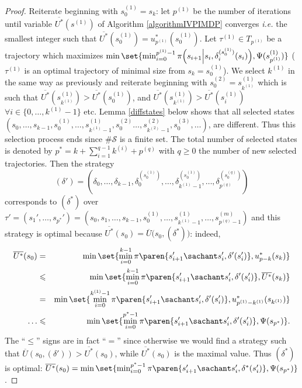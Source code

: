 \begin{proof}
Reiterate beginning with $s^{(1)}_0 = s_k$: 
let $p^{(1)}$ be the number of iterations 
until variable $\overline{U^*}(s^{(1)})$ of Algorithm \ref{algorithmIVPIMDP} converges 
\textit{i.e.} the smallest integer such that 
$\overline{U^*}(s^{(1)}_0) = u^*_{p^{(1)}}(s^{(1)}_0)$. 
Let $\tau^{(1)} \in T_{p^{(1)}}$
be a trajectory 
which maximizes 
$\min \set{ \min_{i=0}^{p^{(1)}-1} \pi \Big(s_{i+1} \Big\vert s_i, 
\delta^{(s_0^{(1)})}_i(s_i) \Big), \Psi(s_{p^{(1)}}^{(1)}) } $ 
($\tau^{(1)}$ is an optimal trajectory of minimal size from $s_k=s_0^{(1)}$). 
We select $k^{(1)}$ in the same way as previously 
and reiterate beginning with $s^{(2)}_0=s^{(1)}_{k^{(1)}}$
 which is such that $\overline{U^*}(s^{(1)}_{k^{(1)}})>\overline{U^*}(s^{(1)}_0)$, 
and $\overline{U^*}(s^{(1)}_{k^{(1)}})>\overline{U^*}(s^{(1)}_i)$ 
$\forall i \in \{0,\ldots, k^{(1)} -1 \} $ etc. 
Lemma \ref{diffstates} below shows that all selected states 
$(s_0,\ldots,s_{k-1},s_0^{(1)},\ldots,s^{(1)}_{k^{(1)}-1},s^{(2)}_0\ldots,s^{(2)}_{k^{(2)}-1},s^{(3)}_0, \ldots )$, 
are different. 
Thus this selection process ends since 
$\# \mathcal{S}$ is a finite set. 
The total number of selected states 
is denoted by $p^*=k + \sum_{i=1}^{q-1} k^{(i)} + p^{(q)}$ 
with $q \geqslant 0$ the number of new selected trajectories. 
Then the strategy 
\[ (\delta')=(\delta_0,\ldots,\delta_{k-1},\delta^{(s_0^{(1)})}_0,\ldots,\delta^{ (s_0^{(1)})}_{k^{(1)}-1},\ldots,\delta^{(s_0^{(q)})}_{p^{(q)}})\] 
corresponds to $(\delta^*)$ over $\tau'=(s_1',\ldots,s_{p^*}') 
= (s_0,s_1,\ldots,s_{k-1},s^{(1)}_{0},\ldots,s^{(1)}_{k^{(1)}-1},\ldots,s^{(m)}_{p^{(q)}-1} )$
and this strategy is optimal because 
$\overline{U^*}(s_0) = \overline{U}\Big(s_0,(\delta^*)\Big)$: indeed,
\begin{eqnarray*}
\overline{U^*}(s_0) &=& \min \set{ \min_{i=0}^{k-1} \pi \paren{s_{i+1}' \sachant s_i',\delta'(s_i') }, u^*_{p-k}(s_k) } \\
&\leqslant& \min \set{ \min_{i=0}^{k-1} \pi \paren{s_{i+1}' \sachant s_i',\delta'(s_i') }, \overline{U^*}(s_k) } \\
&=& \min \set{ \min_{i=0}^{k^{(1)}-1} \pi \paren{s_{i+1}' \sachant s_i',\delta'(s_i') }, u_{p^{(1)}-k^{(1)}}^*(s_{k^{(1)}}) } \\
\hdots &\leqslant& \min \set{ \min_{i=0}^{p^*-1} \pi \paren{s_{i+1}' \sachant s_i',\delta'(s_i') }, \Psi(s_{p^*}) }.
\end{eqnarray*} 
The ``$\leqslant$'' signs are in fact ``$=$'' since otherwise we would 
find a strategy such that $\overline{U}(s_0,(\delta'))>\overline{U^*}(s_0)$,
while $\overline{U^*}(s_0)$ is the maximal value.
Thus $(\delta^*)$ is optimal: $\overline{U^*}(s_0) = \min \set{ \min_{i=0}^{p^*-1} \pi \paren{s_{i+1}' \sachant s_i',\delta^*(s_i') }, \Psi(s_{p^*}) }$.
\end{proof}

